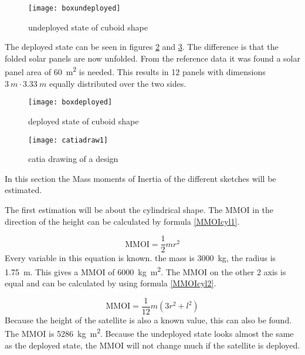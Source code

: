 \begin{figure}[H]
  \centering
  \texttt{[image: boxundeployed]}
  \caption{undeployed state of cuboid shape}
  \label{sketch2}
\end{figure}

The deployed state can be seen in figures \ref{sketch3} and
\ref{sketch3-1}. The difference is that the folded solar panels are
now unfolded. From the reference data it was found a solar panel area
of \SI{60}{m^2} is needed. This results in 12 panels with dimensions
$\SI{3}{m}\cdot\SI{3.33}{m}$ equally distributed over the two sides.

\begin{figure}[H]
  \centering
  \texttt{[image: boxdeployed]}
  \caption{deployed state of cuboid shape}
  \label{sketch3}
\end{figure}


\begin{figure}[H]
  \centering
  \texttt{[image: catiadraw1]}
  \caption{catia drawing of a design}
  \label{sketch3-1}
\end{figure}



In this section the Mass moments of Inertia of the different sketches
will be estimated.


The first estimation will be about the cylindrical shape. The MMOI in
the direction of the height can be calculated by formula
\ref{MMOIcyl1}.

\begin{equation}
  \label{MMOIcyl1}
  \mathrm{MMOI}=\frac{1}{2}mr^2
\end{equation}
Every variable in this equation is known. the mass is \SI{3000}{kg},
the radius is \SI{1.75}{m}. This gives a MMOI of \SI{6000}{kg.m^2}. The
MMOI on the other 2 axis is equal and can be calculated by using
formula \ref{MMOIcyl2}.

\begin{equation}
  \label{MMOIcyl2}
  \mathrm{MMOI}=\frac{1}{12}m(3r^2+l^2)
\end{equation}
Because the height of the satellite is also a known value, this can
also be found.  The MMOI is \SI{5286}{kg.m^2}. Because the undeployed
state looks almost the same as the deployed state, the MMOI will not
change much if the satellite is deployed.

